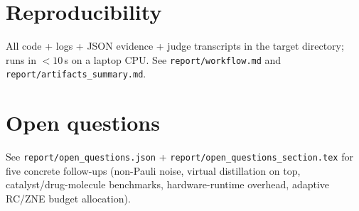 \documentclass[11pt]{article}
\begin{document}
\section{Reproducibility}
All code + logs + JSON evidence + judge transcripts in the target directory;
runs in $<10$\,s on a laptop CPU. See \texttt{report/workflow.md} and
\texttt{report/artifacts\_summary.md}.

\section{Open questions}
See \texttt{report/open\_questions.json} +
\texttt{report/open\_questions\_section.tex} for five concrete follow-ups
(non-Pauli noise, virtual distillation on top, catalyst/drug-molecule
benchmarks, hardware-runtime overhead, adaptive RC/ZNE budget allocation).
\end{document}
